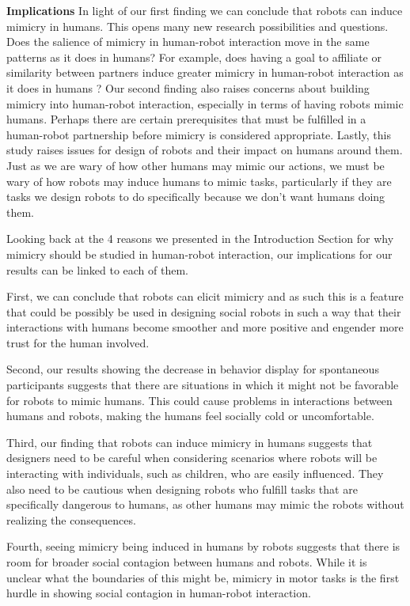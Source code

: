 \documentclass{acm_proc_article-sp}
\begin{document}
\textbf{Implications}
In light of our first finding we can conclude that robots can induce mimicry in humans. This opens many new research possibilities and questions. Does the salience of mimicry in human-robot interaction move in the same patterns as it does in humans? For example, does having a goal to affiliate or similarity between partners induce greater mimicry in human-robot interaction as it does in humans \cite{chartrand2013antecedents}? Our second finding also raises concerns about building mimicry into human-robot interaction, especially in terms of having robots mimic humans. Perhaps there are certain prerequisites that must be fulfilled in a human-robot partnership before mimicry is considered appropriate. Lastly, this study raises issues for design of robots and their impact on humans around them. Just as we are wary of how other humans may mimic our actions, we must be wary of how robots may induce humans to mimic tasks, particularly if they are tasks we design robots to do specifically because we don't want humans doing them.

Looking back at the 4 reasons we presented in the Introduction Section for why mimicry should be studied in human-robot interaction, our implications for our results can be linked to each of them.

First, we can conclude that robots can elicit mimicry and as such this is a feature that could be possibly be used in designing social robots in such a way that their interactions with humans become smoother and more positive and engender more trust for the human involved.

Second, our results showing the decrease in behavior display for spontaneous participants suggests that there are situations in which it might not be favorable for robots to mimic humans. This could cause problems in interactions between humans and robots, making the humans feel socially cold or uncomfortable.

Third, our finding that robots can induce mimicry in humans suggests that designers need to be careful when considering scenarios where robots will be interacting with individuals, such as children, who are easily influenced. They also need to be cautious when designing robots who fulfill tasks that are specifically dangerous to humans, as other humans may mimic the robots without realizing the consequences.

Fourth, seeing mimicry being induced in humans by robots suggests that there is room for broader social contagion between humans and robots. While it is unclear what the boundaries of this might be, mimicry in motor tasks is the first hurdle in showing social contagion in human-robot interaction.
\end{document}
